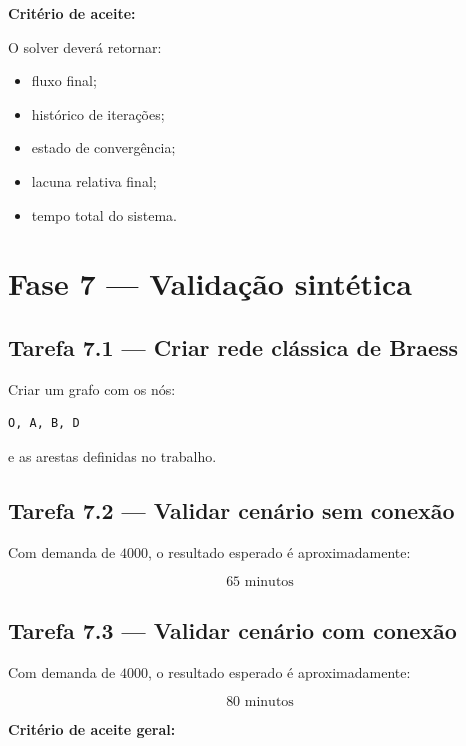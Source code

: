 \documentclass[12pt,a4paper]{article}
\begin{document}
\textbf{Critério de aceite:}

O solver deverá retornar:

\begin{itemize}
    \item fluxo final;
    \item histórico de iterações;
    \item estado de convergência;
    \item lacuna relativa final;
    \item tempo total do sistema.
\end{itemize}

\section{Fase 7 --- Validação sintética}

\subsection{Tarefa 7.1 --- Criar rede clássica de Braess}

Criar um grafo com os nós:

\begin{verbatim}
O, A, B, D
\end{verbatim}

e as arestas definidas no trabalho.

\subsection{Tarefa 7.2 --- Validar cenário sem conexão}

Com demanda de \(4000\), o resultado esperado é aproximadamente:

\begin{equation}
    65 \text{ minutos}
\end{equation}

\subsection{Tarefa 7.3 --- Validar cenário com conexão}

Com demanda de \(4000\), o resultado esperado é aproximadamente:

\begin{equation}
    80 \text{ minutos}
\end{equation}

\textbf{Critério de aceite geral:}
\end{document}
